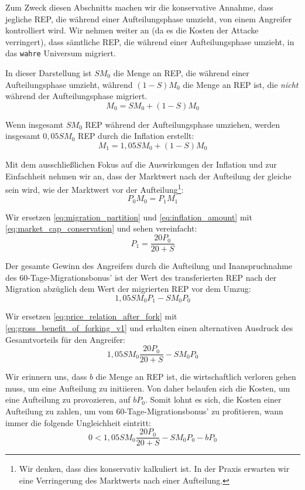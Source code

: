 \documentclass[floatfix,reprint,nofootinbib,amsmath,amssymb,epsfig,pre,floats,letterpaper,groupedaffiliation]{revtex4-1}
\newcommand{\beq}{\begin{equation}}
\newcommand{\eeq}{\end{equation}}
\theoremstyle{definition}
\theoremstyle{definition}
\theoremstyle{definition}
\begin{document}
\begin{appendix}
Zum Zweck diesen Abschnitts machen wir die konservative Annahme, dass jegliche REP, die während einer Aufteilungsphase umzieht, von einem Angreifer kontrolliert wird. Wir nehmen weiter an (da es die Kosten der Attacke verringert), dass sämtliche REP, die während einer Aufteilungsphase umzieht, in das \texttt{wahre} Universum migriert.

In dieser Darstellung ist $SM_0$ die Menge an REP, die während einer Aufteilungsphase umzieht, während $(1-S)M_{0}$ die Menge an REP ist, die \emph{nicht} während der Aufteilungsphase migriert.
\beq\label{eq:migration_partition}
M_{0}=SM_{0}+(1-S)M_{0}
\eeq

Wenn insgesamt $SM_{0}$ REP während der Aufteilungsphase umziehen, werden insgesamt $0,05SM_{0}$ REP durch die Inflation erstellt:
\beq\label{eq:inflation_amount}
M_{1}=1,05SM_{0}+(1-S)M_{0}
\eeq

Mit dem ausschließlichen Fokus auf die Auswirkungen der Inflation und zur Einfachheit nehmen wir an, dass der Marktwert nach der Aufteilung der gleiche sein wird, wie der Marktwert vor der Aufteilung\footnote{Wir denken, dass dies konservativ kalkuliert ist. In der Praxis erwarten wir eine Verringerung des Marktwerts nach einer Aufteilung.}:
\beq\label{eq:market_cap_conservation}
P_{0}M_{0}=P_{1}M_{1}
\eeq

Wir ersetzen \ref{eq:migration_partition} und \ref{eq:inflation_amount} mit \ref{eq:market_cap_conservation} und sehen vereinfacht:
\beq\label{eq:price_relation_after_fork}
P_{1}=\frac{20P_{0}}{20+S}
\eeq

Der gesamte Gewinn des Angreifers durch die Aufteilung und Inanspruchnahme des 60-Tage-Migrationsbonus' ist der Wert des transferierten REP nach der Migration abzüglich dem Wert der migrierten REP vor dem Umzug:
\beq\label{eq:gross_benefit_of_forking_v1}
1,05SM_{0}P_{1}-SM_{0}P_{0}
\eeq

Wir ersetzen \ref{eq:price_relation_after_fork} mit \ref{eq:gross_benefit_of_forking_v1} und erhalten einen alternativen Ausdruck des Gesamtvorteils für den Angreifer:
\beq\label{eq:gross_benefit_of_forking_v2}
1,05SM_{0}\frac{20P_{0}}{20+S}-SM_{0}P_{0}
\eeq

Wir erinnern uns, dass $b$ die Menge an REP ist, die wirtschaftlich verloren gehen muss, um eine Aufteilung zu initiieren. Von daher belaufen sich die Kosten, um eine Aufteilung zu provozieren, auf $bP_0$. Somit lohnt es sich, die Kosten einer Aufteilung zu zahlen, um vom 60-Tage-Migrationsbonus' zu profitieren, wann immer die folgende Ungleichheit eintritt:
\beq\label{eq:profitable_attack_inequality}
0<1,05SM_{0}\frac{20P_{0}}{20+S}-SM_{0}P_{0}-bP_{0}
\eeq


\end{appendix}
\end{document}
